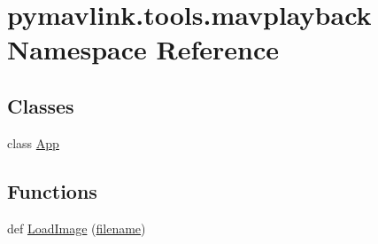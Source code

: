 \hypertarget{namespacepymavlink_1_1tools_1_1mavplayback}{}\section{pymavlink.\+tools.\+mavplayback Namespace Reference}
\label{namespacepymavlink_1_1tools_1_1mavplayback}
\subsection*{Classes}
\begin{DoxyCompactItemize}
\item 
class \mbox{\hyperlink{classpymavlink_1_1tools_1_1mavplayback_1_1App}{App}}
\end{DoxyCompactItemize}
\subsection*{Functions}
\begin{DoxyCompactItemize}
\item 
def \mbox{\hyperlink{namespacepymavlink_1_1tools_1_1mavplayback_a17e3c701be8a8a9874ae66267994781f}{Load\+Image}} (\mbox{\hyperlink{namespacepymavlink_1_1tools_1_1mavplayback_af58db67c35618bb32480880bf6cc83d3}{filename}})
\end{DoxyCompactItemize}
